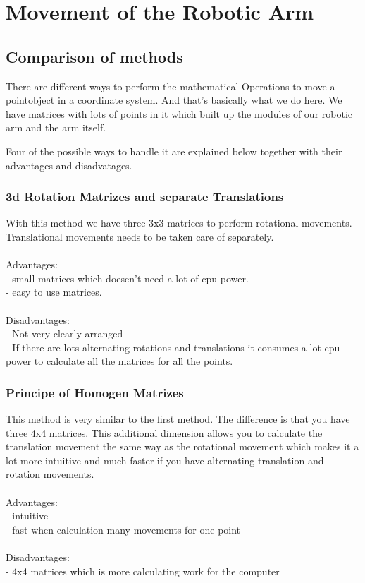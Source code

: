 \chapter{Movement of the Robotic Arm}

\section{Comparison of methods}
There are different ways to perform the mathematical Operations to move a pointobject in a coordinate system. And that's basically what we do here. We have matrices with lots of points in it which built up the modules of our robotic arm and the arm itself.

Four of the possible ways to handle it are explained below together with their advantages and disadvatages.

\subsection{3d Rotation Matrizes and separate Translations}
With this method we have three 3x3 matrices to perform rotational movements. Translational movements needs to be taken care of separately.\\\\
Advantages:\\
- small matrices which doesen't need a lot of cpu power.\\
- easy to use matrices.\\\\
Disadvantages:\\
- Not very clearly arranged\\
- If there are lots alternating rotations and translations it consumes a lot cpu power to calculate all the matrices for all the points. 

\subsection{Principe of Homogen Matrizes}
This method is very similar to the first method. The difference is that you have three 4x4 matrices. This additional dimension allows you to calculate the translation movement the same way as the rotational movement which makes it a lot more intuitive and much faster if you have alternating translation and rotation movements.\\\\
Advantages:\\
- intuitive\\
- fast when calculation many movements for one point\\\\
Disadvantages:\\
- 4x4 matrices which is more calculating work for the computer\\

